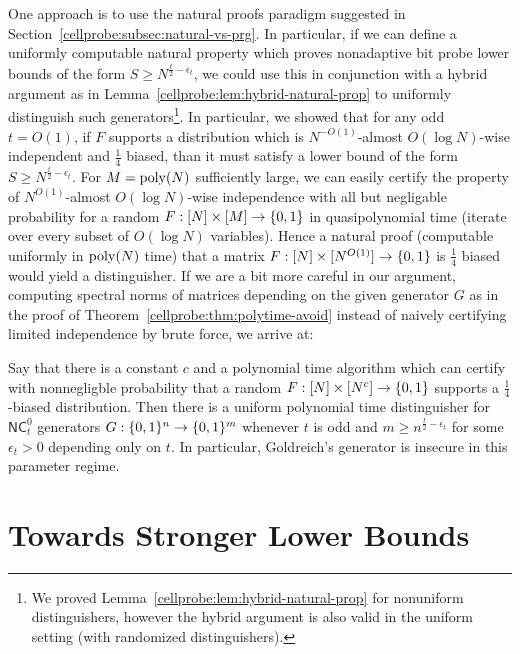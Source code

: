 One approach is to use the natural proofs paradigm suggested in Section~\ref{cellprobe:subsec:natural-vs-prg}. In particular, if we can define a uniformly computable natural property which proves nonadaptive bit probe lower bounds of the form $S \geq N^{\frac{t}{2} - \epsilon_t}$, we could use this in conjunction with a hybrid argument as in Lemma~\ref{cellprobe:lem:hybrid-natural-prop} to uniformly distinguish such generators\footnote{We proved Lemma~\ref{cellprobe:lem:hybrid-natural-prop} for nonuniform distinguishers, however the hybrid argument is also valid in the uniform setting (with randomized distinguishers).}.
In particular, we showed that for any odd $t=O(1)$, if $F$ supports a distribution which is $N^{-O(1)}$-almost $O(\log N)$-wise independent and $\frac{1}{4}$ biased, than it must satisfy a lower bound of the form 
$S \geq N^{\frac{t}{2} - \epsilon_t}$. For $M = \mathrm{poly}(N)$ sufficiently large, we can easily certify the property of $N^{O(1)}$-almost $O(\log N)$-wise independence with all but negligable probability for a random $F: [N] \times [M] \to \{0,1\}$ in quasipolynomial time (iterate over every subset of $O(\log N)$ variables). Hence a natural proof (computable uniformly in $\mathrm{poly}(N)$ time) that a matrix $F: [N] \times [N^{O(1)}] \to \{0,1\}$ is $\frac{1}{4}$ biased would yield a distinguisher. If we are a bit more careful in our argument, computing spectral norms of matrices depending on the given generator $G$ as in the proof of Theorem~\ref{cellprobe:thm:polytime-avoid} instead of naively certifying limited independence by brute force, we arrive at:
\begin{lemma}\label{cellprobe:lem:natural-eps-biased}
Say that there is a constant $c$ and a polynomial time algorithm which can certify with nonnegligble probability that a random $F:[N] \times [N^c] \to \{0,1\}$ supports a $\frac{1}{4}$-biased distribution. Then there is a uniform polynomial time distinguisher for $\mathsf{NC}^0_t$ generators $G: \{0,1\}^n \to \{0,1\}^m$ whenever $t$ is odd and $m \geq n^{\frac{t}{2} -\epsilon_t}$ for some $\epsilon_t>0$ depending only on $t$. In particular, Goldreich's generator is insecure in this parameter regime.
\end{lemma}

\section{Towards Stronger Lower Bounds}\label{cellprobe:sec:connections}


